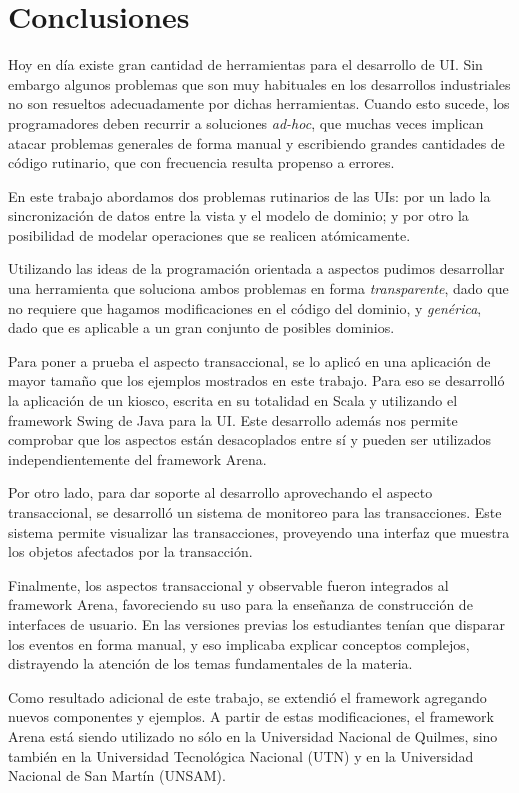 \section{Conclusiones}
\label{Conclusions}
Hoy en día existe gran cantidad de herramientas para el
desarrollo de UI. Sin embargo algunos problemas que son muy habituales en los desarrollos
industriales no son resueltos adecuadamente por dichas herramientas.
Cuando esto sucede, los programadores deben recurrir a soluciones
\emph{ad-hoc},  que muchas veces implican atacar problemas generales de forma
manual y escribiendo grandes cantidades de código rutinario, que con
frecuencia resulta propenso a errores.

En este trabajo abordamos dos problemas rutinarios de las UIs:
por un lado la sincronización de datos entre la vista y el modelo de dominio; y
por otro la posibilidad de modelar operaciones que se realicen atómicamente.

Utilizando las ideas de la programación orientada a aspectos pudimos desarrollar
una herramienta que soluciona ambos problemas en forma \emph{transparente}, dado
que no requiere que hagamos modificaciones en el código del dominio, y \emph{genérica},
dado que es aplicable a un gran conjunto de posibles dominios.

\medskip

Para poner a prueba el aspecto transaccional, se lo aplicó en una aplicación de
mayor tamaño que los ejemplos mostrados en este trabajo.
Para eso se desarrolló la aplicación de un kiosco, escrita en su totalidad en
Scala y utilizando el framework Swing de Java para la UI.
Este desarrollo además nos permite comprobar que los aspectos están desacoplados
entre sí y pueden ser utilizados independientemente del framework Arena.


Por otro lado, para dar soporte al desarrollo aprovechando el aspecto transaccional, 
se desarrolló un sistema de monitoreo para las transacciones.
Este sistema permite visualizar las transacciones, proveyendo una interfaz que muestra los
objetos afectados por la transacción.

\medskip

Finalmente, los aspectos transaccional y observable fueron integrados al framework Arena, 
favoreciendo su uso para la enseñanza de construcción de interfaces de usuario.
En las versiones previas los estudiantes tenían que disparar los eventos en forma
manual, y eso implicaba explicar conceptos complejos, distrayendo la atención de
los temas fundamentales de la materia.

Como resultado adicional de este trabajo, se extendió el framework agregando nuevos componentes y ejemplos. 
A partir de estas modificaciones, el framework Arena está siendo utilizado no
sólo en la Universidad Nacional de Quilmes, sino también en la Universidad
Tecnológica Nacional (UTN) y en la Universidad Nacional de San Martín (UNSAM).
